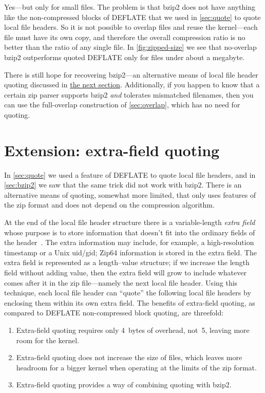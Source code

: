 \documentclass[letterpaper,twocolumn,10pt]{article}
\begin{document}
Yes---but only for small files.
The problem is that bzip2 does not have anything like the
non-compressed blocks of DEFLATE
that we used in \autoref{sec:quote} to quote local file headers.
So it is not possible to overlap files and reuse the kernel---each file must have
its own copy, and therefore the overall compression ratio
is no better than the ratio of any single file.
In \autoref{fig:zipped-size} we see that
no-overlap bzip2 outperforms quoted DEFLATE
only for files under about a megabyte.

There is still hope for recovering bzip2---an
alternative means of local file header quoting
discussed in \hyperref[sec:extra]{the next section}.
Additionally,
if you happen to know that a certain zip parser supports bzip2
\emph{and} tolerates mismatched filenames,
then you can use the full-overlap construction of \autoref{sec:overlap},
which has no need for quoting.


\section{Extension: extra-field quoting}
\label{sec:extra}

In \autoref{sec:quote} we used a feature of
DEFLATE to quote local file headers,
and in \autoref{sec:bzip2} we saw that the same trick
did not work with bzip2.
There is an alternative means of quoting,
somewhat more limited,
that only uses features of the zip format
and does not depend on the compression algorithm.

At the end of the local file header structure
there is a variable-length
\emph{extra field} whose purpose is to store information
that doesn't fit into the ordinary fields of the header~\cite[\S 4.3.7]{appnote}.
The extra information may include, for example,
a high-resolution timestamp or a Unix uid/gid;
Zip64 information is stored in the extra field.
The extra field is represented as a length--value structure;
if we increase the length field without adding value,
then the extra field will grow to include whatever
comes after it in the zip file---namely
the next local file header.
Using this technique, each local file header
can ``quote'' the following local file headers
by enclosing them within its own extra field.
The benefits of extra-field quoting,
as compared to DEFLATE non-compressed block quoting,
are threefold:

\begin{enumerate}
\item Extra-field quoting requires only \SI{4}{bytes} of overhead,
not~\num{5}, leaving more room for the kernel.
\item Extra-field quoting does not increase the size of files,
which leaves more headroom for a bigger kernel when
operating at the limits of the zip format.
\item Extra-field quoting provides a way of combining quoting with bzip2.
\end{enumerate}
\end{document}
